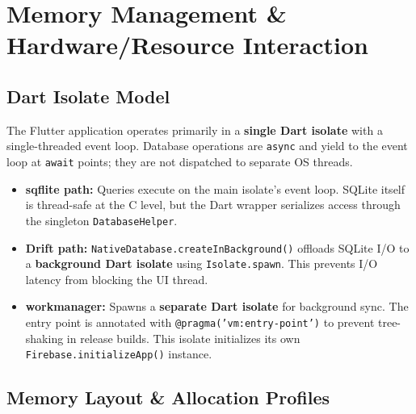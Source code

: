 \documentclass[12pt,a4paper,openany]{report}
\begin{document}
\chapter{Memory Management \& Hardware/Resource Interaction}

\section{Dart Isolate Model}

The Flutter application operates primarily in a \textbf{single Dart isolate} with a single-threaded event loop. Database operations are \texttt{async} and yield to the event loop at \texttt{await} points; they are not dispatched to separate OS threads.

\begin{itemize}[leftmargin=*]
  \item \textbf{sqflite path:} Queries execute on the main isolate's event loop. SQLite itself is thread-safe at the C level, but the Dart wrapper serializes access through the singleton \texttt{DatabaseHelper}.
  \item \textbf{Drift path:} \texttt{NativeDatabase.createInBackground()} offloads SQLite I/O to a \textbf{background Dart isolate} using \texttt{Isolate.spawn}. This prevents I/O latency from blocking the UI thread.
  \item \textbf{workmanager:} Spawns a \textbf{separate Dart isolate} for background sync. The entry point is annotated with \texttt{@pragma('vm:entry-point')} to prevent tree-shaking in release builds. This isolate initializes its own \texttt{Firebase.initializeApp()} instance.
\end{itemize}

\section{Memory Layout \& Allocation Profiles}
\end{document}
